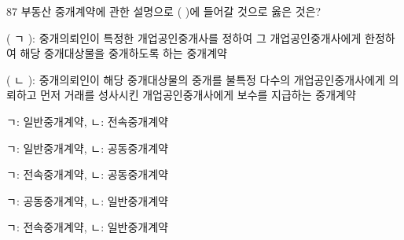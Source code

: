 \begin{question}{87}
부동산 중개계약에 관한 설명으로 ( )에 들어갈 것으로 옳은 것은?
\begin{framedtext}
( ㄱ ): 중개의뢰인이 특정한 개업공인중개사를 정하여 그 개업공인중개사에게 한정하여 해당 중개대상물을 중개하도록 하는 중개계약 \par
( ㄴ ): 중개의뢰인이 해당 중개대상물의 중개를 불특정 다수의 개업공인중개사에게 의뢰하고 먼저 거래를 성사시킨 개업공인중개사에게 보수를 지급하는 중개계약 \par
\end{framedtext}
\begin{choices}
  \item ㄱ: 일반중개계약, ㄴ: 전속중개계약
  \item ㄱ: 일반중개계약, ㄴ: 공동중개계약
  \item ㄱ: 전속중개계약, ㄴ: 공동중개계약
  \item ㄱ: 공동중개계약, ㄴ: 일반중개계약
  \item ㄱ: 전속중개계약, ㄴ: 일반중개계약
\end{choices}
\end{question}
